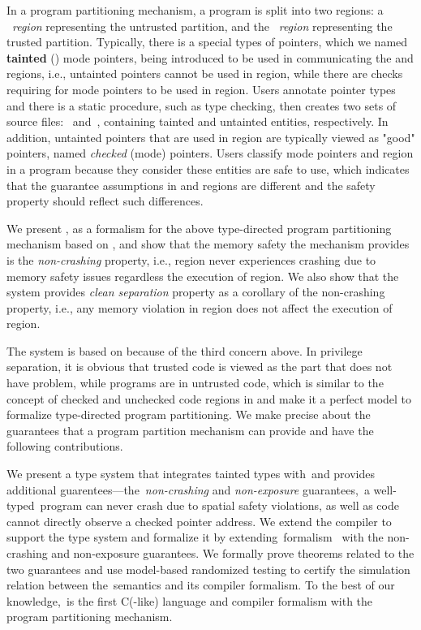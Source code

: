 In a program partitioning mechanism, a program is split into two regions: a \umode~\emph{region} representing the untrusted partition, and the \cmode~\emph{region} representing the trusted partition. Typically, there is a special types of pointers, which we named \textbf{tainted} (\tmode) mode pointers, being introduced to be used in communicating the \umode and \cmode regions, i.e.,
untainted pointers cannot be used in \umode region, while there are checks requiring for \tmode mode pointers to be used in \cmode region.
Users annotate pointer types and there is a static procedure, such as type checking, then creates two sets of source files:~\ucregion{} and~\cregion{}, containing tainted and untainted entities, respectively.
In addition, untainted pointers that are used in \cmode region are typically viewed as "good" pointers, named \emph{checked} (\cmode mode) pointers. Users classify \cmode mode pointers and \cmode region in a program because they consider these entities are safe to use, which indicates that the guarantee assumptions in \cmode and \umode regions are different and the safety property should reflect such differences.

We present \systemname, as a formalism for the above type-directed program partitioning mechanism based on \checkedc,
and show that the memory safety the mechanism provides is the \emph{non-crashing} property, i.e.,
\cmode region never experiences crashing due to memory safety issues regardless the execution of \umode region.
We also show that the system provides \emph{clean separation} property as a corollary of the non-crashing property,
i.e., any memory violation in \umode region does not affect the execution of \cmode region.


The system is based on \checkedc because of the third concern above. In privilege separation, it is obvious that trusted code is viewed as the part that does not have problem, while programs are in untrusted code, which is similar to the concept of checked and unchecked code regions in \checkedc and make it a perfect model to formalize type-directed program partitioning.
We make precise about the guarantees that a program partition mechanism can provide and have the following contributions.

We present a type system that integrates tainted types with~\checkedc and provides additional guarentees---the~\emph{non-crashing} and \emph{non-exposure} guarantees,~\ie a well-typed~\systemname program can never crash due to spatial safety violations,
as well as \ucregion code cannot directly observe a checked pointer address.
We extend the \checkedc compiler to support the type system and
formalize it by extending~\checkedc formalism~\cite{li22checkedc} with the non-crashing and non-exposure guarantees.
We formally prove theorems related to the two guarantees and use model-based randomized testing \cite{Pierce:SF4} to certify the simulation relation between the~\systemname semantics and its compiler formalism.
To the best of our knowledge,~\systemname is the first C(-like) language and compiler formalism with the program partitioning mechanism.


